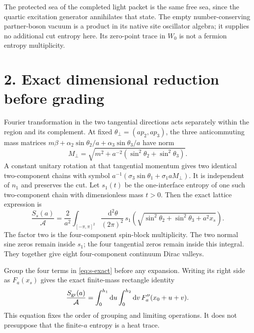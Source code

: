 \documentclass[10pt]{article}
\newcommand{\dd}{\,\mathrm d}
\begin{document}
The protected sea of the completed light packet is the same free
sea, since the quartic excitation generator annihilates that state.
The empty number-conserving partner-boson vacuum is a product in
its native site oscillator algebra; it supplies no additional cut
entropy here. Its zero-point trace in $W_0$ is not a fermion entropy
multiplicity.

\section*{2. Exact dimensional reduction before grading}
Fourier transformation in the two tangential directions acts
separately within the region and its complement. At fixed
$\theta_\perp=(ap_2,ap_3)$, the three anticommuting mass matrices
$m\beta+\alpha_2\sin\theta_2/a+\alpha_3\sin\theta_3/a$
have norm
\[
 M_\perp=\sqrt{m^2+a^{-2}
                    (\sin^2\theta_2+\sin^2\theta_3)}.
\]
A constant unitary rotation at that tangential momentum gives two
identical two-component chains with symbol
$a^{-1}(\sigma_3\sin\theta_1+\sigma_1 aM_\perp)$.
It is independent of $n_1$ and preserves the cut. Let $s_1(t)$ be
the one-interface entropy of one such two-component chain with
dimensionless mass $t>0$. Then the exact lattice expression is
\begin{equation}
 \frac{S_s(a)}{\mathcal A}
 =\frac2{a^2}\int_{[-\pi,\pi]^2}
       \frac{\dd^2\theta}{(2\pi)^2}\,
       s_1\!\left(\sqrt{\sin^2\theta_2+\sin^2\theta_3+a^2x_s}\right).
 \label{eq:s-exact}
\end{equation}
The factor two is the four-component spin-block multiplicity.
The two normal sine zeros remain inside $s_1$; the four tangential
zeros remain inside this integral. They together give eight
four-component continuum Dirac valleys.

Group the four terms in \eqref{eq:s-exact} before any expansion.
Writing its right side as $F_a(x_s)$ gives the exact finite-mass
rectangle identity
\begin{equation}
 \frac{S_{\rm gr}(a)}{\mathcal A}
 =\int_0^{h_1}\!\dd u\int_0^{h_2}\!\dd v\,
       F_a''(x_0+u+v).
 \label{eq:s-groupfirst}
\end{equation}
This equation fixes the order of grouping and limiting operations.
It does not presuppose that the finite-$a$ entropy is a heat trace.
\end{document}
